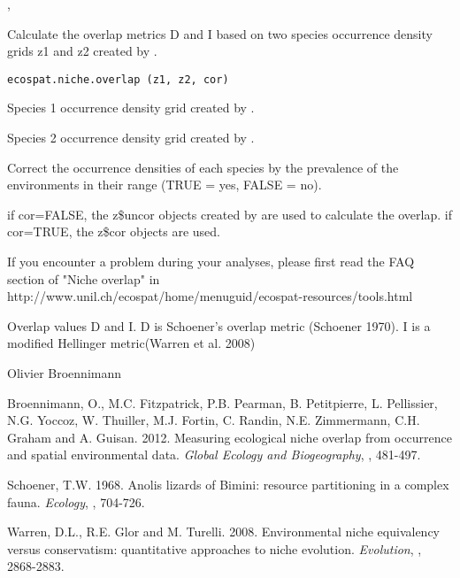 \documentclass[a4paper]{book}
\begin{document}
%
\begin{SeeAlso}\relax
{}, 
\end{SeeAlso}
%
\begin{Description}\relax
Calculate the overlap metrics D and I based on two species occurrence density grids z1 and z2 created by .
\end{Description}
%
\begin{Usage}
\begin{verbatim}
ecospat.niche.overlap (z1, z2, cor)
\end{verbatim}
\end{Usage}
%
\begin{Arguments}
\begin{ldescription}
\item[\code{z1}] Species 1 occurrence density grid created by .
\item[\code{z2}] Species 2 occurrence density grid created by .
\item[\code{cor}] Correct the occurrence densities of each species by the prevalence of the environments in their range (TRUE = yes, FALSE = no).
\end{ldescription}
\end{Arguments}
%
\begin{Details}\relax
if cor=FALSE, the z\$uncor objects created by  are used to calculate the overlap. if cor=TRUE, the z\$cor objects are used.

If you encounter a problem during your analyses, please first read the FAQ section of "Niche overlap" in http://www.unil.ch/ecospat/home/menuguid/ecospat-resources/tools.html
\end{Details}
%
\begin{Value}
Overlap values D and I. D is Schoener's overlap metric (Schoener 1970). I is a modified Hellinger metric(Warren et al. 2008)
\end{Value}
%
\begin{Author}\relax
Olivier Broennimann 
\end{Author}
%
\begin{References}\relax
Broennimann, O., M.C. Fitzpatrick, P.B. Pearman, B. Petitpierre, L. Pellissier, N.G. Yoccoz, W. Thuiller, M.J. Fortin, C. Randin, N.E. Zimmermann, C.H. Graham and A. Guisan. 2012. Measuring ecological niche overlap from occurrence and spatial environmental data. \emph{Global Ecology and Biogeography}, , 481-497.

Schoener, T.W. 1968. Anolis lizards of Bimini: resource partitioning in a complex fauna. \emph{Ecology}, , 704-726.

Warren, D.L., R.E. Glor and M. Turelli. 2008. Environmental niche equivalency versus conservatism: quantitative approaches to niche evolution. \emph{Evolution}, , 2868-2883.
\end{References}
\end{document}
